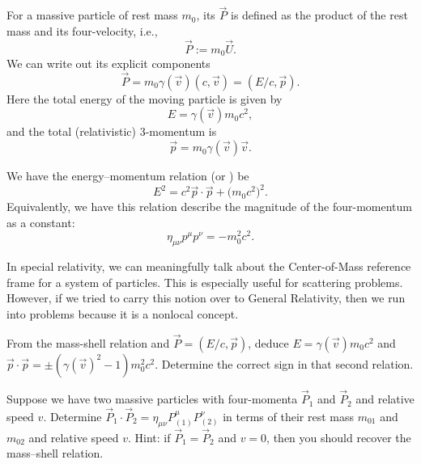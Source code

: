 For a massive particle of rest mass $m_{0}$, its 
$\vec{P}$ is defined as the product of the rest mass and its
four-velocity, i.e.,
\begin{equation}
\vec{P} := m_{0}\vec{U}.
\end{equation}
We can write out its explicit components
\begin{equation}
\vec{P} = m_{0}\gamma(\vec{v})(c, \vec{v}) = (E/c, \vec{p}).
\end{equation}
Here the total energy of the moving particle is given by
\begin{equation}
E = \gamma(\vec{v})m_{0}c^{2},
\end{equation}
and the total (relativistic) 3-momentum is
\begin{equation}
\vec{p} = m_{0}\gamma(\vec{v})\vec{v}.
\end{equation}

We have the energy--momentum relation (or )
be
\begin{equation}
E^{2} = c^{2}\vec{p}\cdot\vec{p} + \bigl(m_{0}c^{2}\bigr)^{2}.
\end{equation}
Equivalently, we have this relation describe the magnitude of the
four-momentum as a constant:
\begin{equation}
\eta_{\mu\nu}p^{\mu}p^{\nu} = -m_{0}^{2}c^{2}.
\end{equation}

\begin{ddanger}
In special relativity, we can meaningfully talk about the Center-of-Mass
reference frame for a system of particles. This is especially useful for
scattering problems. However, if we tried to carry this notion over to
General Relativity, then we run into problems because it is a nonlocal
concept. 
\end{ddanger}

\begin{exercise}
From the mass-shell relation and $\vec{P} = (E/c, \vec{p})$, deduce
$E = \gamma(\vec{v})m_{0}c^{2}$ and 
$\vec{p}\cdot\vec{p}=\pm(\gamma(\vec{v})^{2}-1)m_{0}^{2}c^{2}$.
Determine the correct sign in that second relation.
\end{exercise}

\begin{exercise}
Suppose we have two massive particles with four-momenta $\vec{P}_{1}$
and $\vec{P}_{2}$ and relative speed $v$. Determine
$\vec{P}_{1}\cdot\vec{P}_{2}=\eta_{\mu\nu}P^{\mu}_{(1)}P^{\nu}_{(2)}$ in
terms of their rest mass $m_{01}$ and $m_{02}$ and relative speed $v$.
Hint: if $\vec{P}_{1}=\vec{P}_{2}$ and $v=0$, then you should recover
the mass--shell relation.
\end{exercise}

